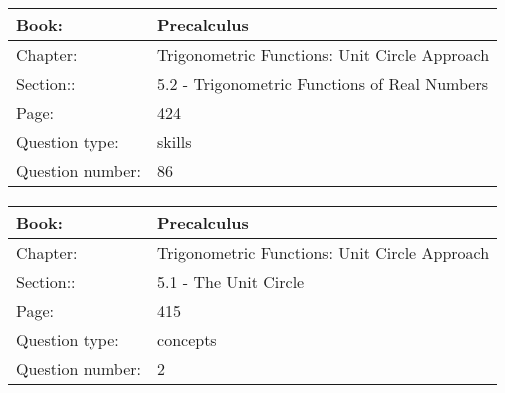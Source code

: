\documentclass{article}
\begin{document}
            \paragraph{}
            \begin{tabularx}{1\textwidth}{
                    p{}
                    p{}
                }
                \toprule
                Book: & Precalculus
                \\
                \midrule
                Chapter: & Trigonometric Functions: Unit Circle Approach
                \\
                \midrule
                Section:: & 5.2 - Trigonometric Functions of Real Numbers
                \\
                \midrule
                Page: & 424
                \\
                \midrule
                Question type: & skills
                \\
                \midrule
                Question number: & 86
                \\
                \bottomrule
            \end{tabularx}
            
            \paragraph{}
            \begin{tabularx}{1\textwidth}{
                    p{}
                    p{}
                }
                \toprule
                Book: & Precalculus
                \\
                \midrule
                Chapter: & Trigonometric Functions: Unit Circle Approach
                \\
                \midrule
                Section:: & 5.1 - The Unit Circle
                \\
                \midrule
                Page: & 415
                \\
                \midrule
                Question type: & concepts
                \\
                \midrule
                Question number: & 2
                \\
                \bottomrule
            \end{tabularx}
            
        
\end{document}
